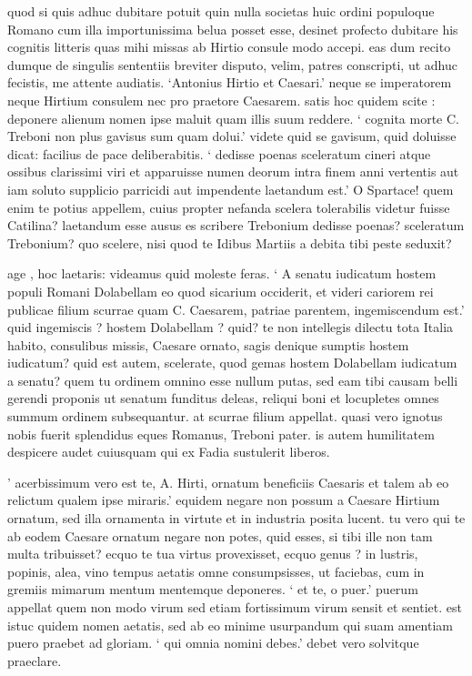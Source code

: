  quod si quis adhuc dubitare potuit quin nulla societas huic ordini populoque Romano cum illa importunissima belua posset esse, desinet profecto dubitare his cognitis litteris quas mihi missas ab Hirtio consule modo accepi. eas dum recito dumque de singulis sententiis breviter disputo, velim, patres conscripti, ut adhuc fecistis, me attente audiatis. `Antonius Hirtio et Caesari.' neque se imperatorem neque Hirtium consulem nec pro praetore Caesarem. satis hoc quidem scite : deponere alienum nomen ipse maluit quam illis suum reddere. ` cognita morte C. Treboni non plus gavisus sum quam dolui.' videte quid se gavisum, quid doluisse dicat: facilius de pace deliberabitis. ` dedisse poenas sceleratum cineri atque ossibus clarissimi viri et apparuisse numen deorum intra finem anni vertentis aut iam soluto supplicio parricidi aut impendente laetandum est.' O Spartace! quem enim te potius appellem, cuius propter nefanda scelera tolerabilis videtur fuisse Catilina? laetandum esse ausus es scribere Trebonium dedisse poenas? sceleratum Trebonium? quo scelere, nisi quod te Idibus Martiis a debita tibi peste seduxit?

 age , hoc laetaris: videamus quid moleste feras. ` A senatu iudicatum hostem populi Romani Dolabellam eo quod sicarium occiderit, et videri cariorem rei publicae filium scurrae quam C. Caesarem, patriae parentem, ingemiscendum est.' quid ingemiscis ? hostem Dolabellam ? quid? te non intellegis dilectu tota Italia habito, consulibus missis, Caesare ornato, sagis denique sumptis hostem iudicatum? quid est autem, scelerate, quod gemas hostem Dolabellam iudicatum a senatu? quem tu ordinem omnino esse nullum putas, sed eam tibi causam belli gerendi proponis ut senatum funditus deleas, reliqui boni et locupletes omnes summum ordinem subsequantur. at scurrae filium appellat. quasi vero ignotus nobis fuerit splendidus eques Romanus, Treboni pater. is autem humilitatem despicere audet cuiusquam qui ex Fadia sustulerit liberos.

 ' acerbissimum vero est te, A. Hirti, ornatum beneficiis Caesaris et talem ab eo relictum qualem ipse miraris.' equidem negare non possum a Caesare Hirtium ornatum, sed illa ornamenta in virtute et in industria posita lucent. tu vero qui te ab eodem Caesare ornatum negare non potes, quid esses, si tibi ille non tam multa tribuisset? ecquo te tua virtus provexisset, ecquo genus ? in lustris, popinis, alea, vino tempus aetatis omne consumpsisses, ut faciebas, cum in gremiis mimarum mentum mentemque deponeres. ` et te, o puer.' puerum appellat quem non modo virum sed etiam fortissimum virum sensit et sentiet. est istuc quidem nomen aetatis, sed ab eo minime usurpandum qui suam amentiam puero praebet ad gloriam. ` qui omnia nomini debes.' debet vero solvitque praeclare.

